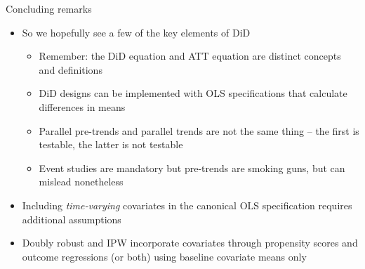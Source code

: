 \documentclass{beamer}
\begin{document}
\begin{frame}{Concluding remarks}

\begin{itemize}
\item So we hopefully see a few of the key elements of DiD
	\begin{itemize}
	\item Remember: the DiD equation and ATT equation are distinct concepts and definitions
	\item DiD designs can be implemented with OLS specifications that calculate differences in means
	\item Parallel pre-trends and parallel trends are not the same thing -- the first is testable, the latter is not testable
	\item Event studies are mandatory but pre-trends are smoking guns, but can mislead nonetheless
	\end{itemize}
\item Including \emph{time-varying} covariates in the canonical OLS specification requires additional assumptions
\item Doubly robust and IPW incorporate covariates through propensity scores and outcome regressions (or both) using baseline covariate means only
\end{itemize}

\end{frame}
\end{document}
